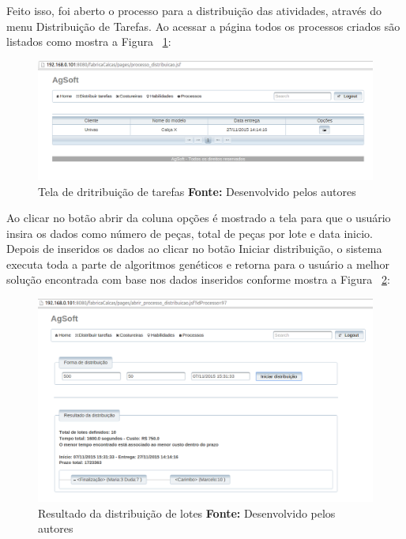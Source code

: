 \par Feito isso, foi aberto o processo para a distribuição
das atividades, através do menu Distribuição de Tarefas.
Ao acessar a página todos os processos criados são
listados como mostra a Figura ~\ref{fig:distribuicao_tarefas}:

\begin{figure}[h!]
	\centerline{\includegraphics[scale=0.4]{./imagens/tela_distribuicao_tarefas.png}}
	\caption[Tela de dritribuição de tarefas]
	{Tela de dritribuição de tarefas \textbf{Fonte:} Desenvolvido
	pelos autores}
	\label{fig:distribuicao_tarefas}
\end{figure}


\par Ao clicar no botão abrir da coluna opções é mostrado a tela para que o
usuário insira os dados como número de peças, total de peças por lote e data inicio. Depois de
inseridos os dados ao clicar no botão Iniciar distribuição, o sistema executa
toda a parte de algoritmos genéticos e retorna para o usuário a melhor solução
encontrada com base nos dados inseridos conforme mostra a Figura ~\ref{fig:resultado_distribuicao_teste1}:


\begin{figure}[h!]
	\centerline{\includegraphics[scale=0.4]{./imagens/resultado_distribuicao_teste1.png}}
	\caption[Resultado da distribuição de lotes]
	{Resultado da distribuição de lotes \textbf{Fonte:} Desenvolvido pelos autores}
	\label{fig:resultado_distribuicao_teste1}
\end{figure}

